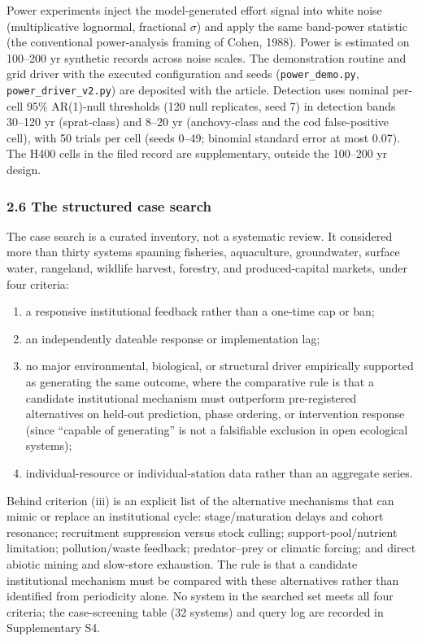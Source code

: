 \documentclass[11pt]{article}
\providecommand{\tightlist}{\setlength{\itemsep}{0pt}\setlength{\parskip}{0pt}}
\begin{document}
Power experiments inject the model-generated effort signal into
white noise (multiplicative lognormal, fractional \(\sigma\)) and apply the same band-power statistic (the
conventional power-analysis framing of Cohen, 1988). Power is estimated
on 100--200 yr synthetic records across noise scales. The demonstration
routine and grid driver with the executed configuration and seeds
(\texttt{power\_demo.py}, \texttt{power\_driver\_v2.py}) are deposited
with the article. Detection uses nominal per-cell 95\% AR(1)-null thresholds (120 null replicates, seed 7) in detection bands 30--120 yr (sprat-class) and 8--20 yr (anchovy-class and the cod false-positive cell), with 50 trials per cell (seeds 0--49; binomial standard error at most 0.07). The H400 cells in the filed record are supplementary, outside the 100--200 yr design.

\subsubsection{2.6 The structured case
search}\label{the-structured-case-search}

The case search is a curated inventory, not a systematic review.
It considered more than thirty systems spanning fisheries, aquaculture,
groundwater, surface water, rangeland, wildlife harvest, forestry, and
produced-capital markets, under four criteria:

\begin{enumerate}
\def\labelenumi{(\roman{enumi})}
\tightlist
\item
  a responsive institutional feedback rather than a one-time cap or ban;
\item
  an independently dateable response or implementation lag;
\item
  no major environmental, biological, or structural driver empirically
  supported as generating the same outcome, where the comparative rule
  is that a candidate institutional mechanism must outperform
  pre-registered alternatives on held-out prediction, phase ordering, or
  intervention response (since ``capable of generating'' is not a
  falsifiable exclusion in open ecological systems);
\item
  individual-resource or individual-station data rather than an
  aggregate series.
\end{enumerate}

Behind criterion (iii) is an explicit list of the alternative
mechanisms that can mimic or replace an institutional cycle:
stage/maturation delays and cohort resonance; recruitment suppression
versus stock culling; support-pool/nutrient limitation; pollution/waste
feedback; predator--prey or climatic forcing; and direct abiotic mining
and slow-store exhaustion. The rule is that a candidate institutional
mechanism must be compared with these alternatives rather than
identified from periodicity alone. No system in the searched set meets all four criteria; the case-screening table (32 systems) and query log are recorded in Supplementary S4.
\end{document}
